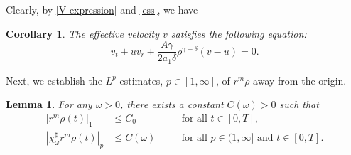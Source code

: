 \documentclass[11pt,reqno]{amsart}
\newtheorem{lem}{Lemma}[section]
\newtheorem{cor}{Corollary}[section]
\numberwithin{rk}{section}
\numberwithin{prop}{section}
\numberwithin{mydef}{section}
\numberwithin{lem}{section}
\numberwithin{equation}{section}
\numberwithin{thm}{section}
\begin{document}
Clearly, by \eqref{V-expression} and \eqref{ess}, we have
\begin{cor}\label{cor-v}
The effective velocity $v$ satisfies the following equation{\rm:}
\begin{equation}\label{eq:effective2}
v_t+uv_r+ \frac{A\gamma}{2a_1\delta} \rho^{\gamma-\delta} (v-u)=0.
\end{equation}
\end{cor}
 

Next, we establish the $L^p$-estimates, $p\in [1,\infty]$, of $r^m\rho$ away from the origin.
\begin{lem}\label{far-p-infty}
For any $\omega>0$, there exists a constant $C(\omega)>0$ such that 
\begin{equation*}
\begin{aligned}
|r^m \rho(t)|_1&\leq C_0&&\quad \text{for all $t\in[0,T]$},\\
|\chi^\sharp_\omega r^m \rho(t)|_p&\leq C(\omega)&&\quad \text{for all $p\in (1,\infty]$ and $t\in[0,T]$}.
\end{aligned}
\end{equation*}
\end{lem}
\end{document}
